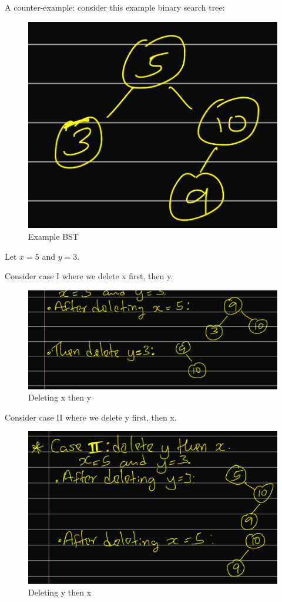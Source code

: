 \documentclass[11pt]{article}
\begin{document}
\begin{enumerate}
\begin{enumerate}
A counter-example: consider this example binary search tree:
\begin{figure}[H]
  \centering
  \includegraphics{IMG_3438.png}
  \caption{Example BST}
  \label{fig:yourlabel}
\end{figure}

Let $x=5$ and $y=3$.

Consider case I where we delete x first, then y.
\begin{figure}[H]
  \centering
  \includegraphics[width=\textwidth]{IMG_5015.png}
  \caption{Deleting x then y}
  \label{fig:yourlabel}
\end{figure}

Consider case II where we delete y first, then x.
\begin{figure}[H]
  \centering
  \includegraphics[width=\textwidth]{IMG_2743.png}
  \caption{Deleting y then x}
  \label{fig:yourlabel}
\end{figure}


\end{enumerate}
\end{enumerate}
\end{document}
